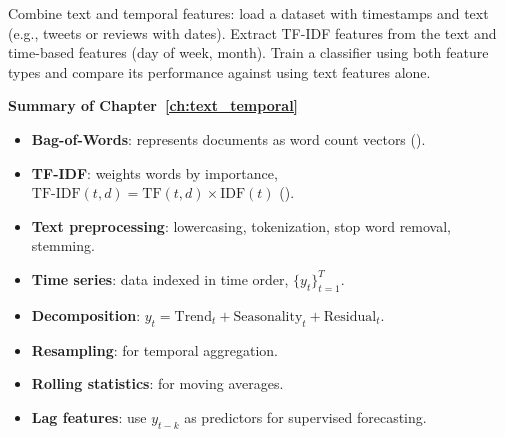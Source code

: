 \begin{exercise}[$\star\star\star$]
Combine text and temporal features: load a dataset with timestamps and text (e.g., tweets or reviews with dates). Extract TF-IDF features from the text and time-based features (day of week, month). Train a classifier using both feature types and compare its performance against using text features alone.
\end{exercise}

\begin{keyformulas}
\textbf{Summary of Chapter~\ref{ch:text_temporal}}
\begin{itemize}
    \item \textbf{Bag-of-Words}: represents documents as word count vectors ().
    \item \textbf{TF-IDF}: weights words by importance, $\text{TF-IDF}(t,d) = \text{TF}(t,d) \times \text{IDF}(t)$ ().
    \item \textbf{Text preprocessing}: lowercasing, tokenization, stop word removal, stemming.
    \item \textbf{Time series}: data indexed in time order, $\{y_t\}_{t=1}^{T}$.
    \item \textbf{Decomposition}: $y_t = \text{Trend}_t + \text{Seasonality}_t + \text{Residual}_t$.
    \item \textbf{Resampling}:  for temporal aggregation.
    \item \textbf{Rolling statistics}:  for moving averages.
    \item \textbf{Lag features}: use $y_{t-k}$ as predictors for supervised forecasting.
\end{itemize}
\end{keyformulas}

